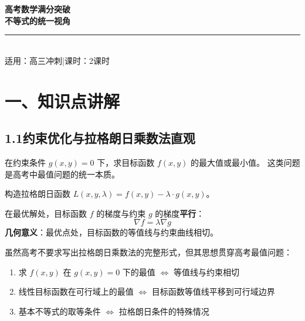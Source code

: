 \documentclass[12pt, a4paper]{ctexart}
\begin{document}
\begin{center}
{\Huge\bfseries\textcolor{mainblue}{高考数学满分突破}}\\[8pt]
{\LARGE\bfseries\textcolor{mainblue}{不等式的统一视角}}\\[12pt]
\rule{0.6\textwidth}{1pt}\\[8pt]
{\normalsize 适用：高三冲刺\quad |\quad 课时：2课时}
\end{center}
\vspace{10pt}

\section*{\textcolor{mainblue}{一、知识点讲解}}

\subsection*{1.1\quad 约束优化与拉格朗日乘数法直观}

\begin{knowledgebox}[约束优化问题的一般形式]
在约束条件 $g(x, y) = 0$ 下，求目标函数 $f(x, y)$ 的最大值或最小值。
这类问题是高考中最值问题的统一本质。
\end{knowledgebox}

\begin{knowledgebox}[拉格朗日乘数法的几何直觉]
构造拉格朗日函数 $L(x, y, \lambda) = f(x, y) - \lambda \cdot g(x, y)$。

在最优解处，目标函数 $f$ 的梯度与约束 $g$ 的梯度\textbf{平行}：
\[ \nabla f = \lambda \nabla g \]
\textbf{几何意义}：最优点处，目标函数的等值线与约束曲线相切。
\end{knowledgebox}

\begin{tipbox}[高考中的直观应用]
虽然高考不要求写出拉格朗日乘数法的完整形式，但其思想贯穿高考最值问题：
\begin{enumerate}[label=(\arabic*)]
  \item 求 $f(x,y)$ 在 $g(x,y) = 0$ 下的最值 $\Longleftrightarrow$ 等值线与约束相切
  \item 线性目标函数在可行域上的最值 $\Longleftrightarrow$ 目标函数等值线平移到可行域边界
  \item 基本不等式的取等条件 $\Longleftrightarrow$ 拉格朗日条件的特殊情况
\end{enumerate}
\end{tipbox}
\end{document}
